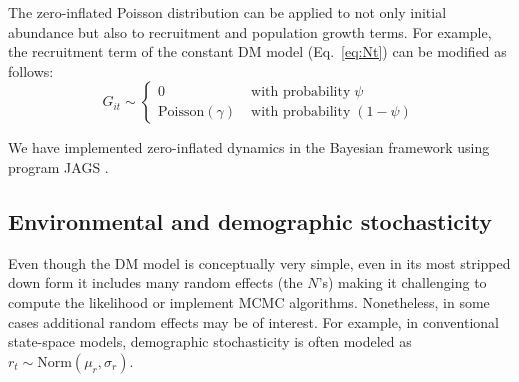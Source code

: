 \documentclass[12pt]{article}
\begin{document}

The zero-inflated Poisson distribution can be applied to not only
initial abundance but also to recruitment and population growth
terms. For example, the recruitment term of the constant DM model
(Eq.~\ref{eq:Nt}) can be modified as follows:
\begin{equation}
G_{it} \sim \left\{
\begin{aligned}
0 &\; \text{with probability} \; \psi \\
\mathrm{Poisson}(\gamma) &\; \text{with probability} \; (1-\psi)\end{aligned} \right.
\label{eq:ZIPts}
\end{equation}

We have implemented
zero-inflated dynamics in the Bayesian framework using program
\textrm{JAGS} \citep[version 3.2.0]{plummer:2003}.


\subsection{Environmental and demographic stochasticity}

Even though the DM model is conceptually very simple, even in
its most stripped down form it includes many random effects (the $N$'s)
making it challenging to compute the likelihood or implement MCMC
algorithms. Nonetheless, in some cases additional random effects
may be of interest. For example, in conventional state-space models,
demographic stochasticity is often modeled as $r_t \sim
\text{Norm}(\mu_r, \sigma_r)$.
\end{document}
